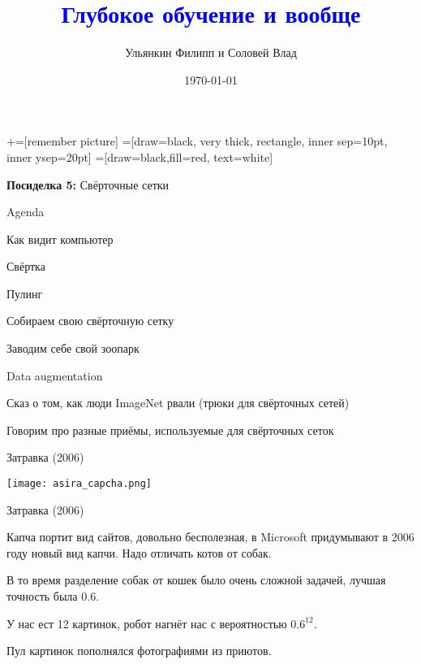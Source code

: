 \documentclass[notes,12pt, aspectratio=169]{beamer}
\title[]{\textcolor{blue}{Глубокое обучение и вообще}}
\author{Ульянкин Филипп и Соловей Влад}
\date{\today}
\newenvironment{wideitemize}{\itemize\addtolength{\itemsep}{10pt}}{\enditemize}
\begin{document}
\newcommand\marktopleft[1]{%
    \tikz[overlay,remember picture] 
        \node (marker-#1-a) at (-.3em,.3em) {};%
}
\newcommand\markbottomright[2]{%
    \tikz[overlay,remember picture] 
        \node (marker-#1-b) at (0em,0em) {};%
}
+=[remember picture] 
 =[draw=black, very thick, rectangle, inner sep=10pt, inner ysep=20pt]
 =[draw=black,fill=red, text=white]


\begin{frame}
\maketitle
\centering \textbf{\color{blue} Посиделка 5:} Свёрточные сетки
\end{frame}



\begin{frame}{Agenda}
\begin{wideitemize}
	\item Как видит компьютер
	\item Свёртка
	\item Пулинг
	\item Собираем свою свёрточную сетку 
	\item Заводим себе свой зоопарк 
	\item Data augmentation 
	\item Сказ о том, как люди ImageNet рвали  (трюки для свёрточных сетей)
	\item Говорим про разные приёмы, используемые для свёрточных сеток
\end{wideitemize} 
\end{frame}


\begin{frame}{Затравка (2006)}
\begin{center}
	\texttt{[image: asira\_capcha.png]}
\end{center}
\end{frame}


\begin{frame}{Затравка (2006)}
\begin{wideitemize}
	\item Капча портит вид сайтов, довольно бесполезная, в Microsoft придумывают в 2006 году новый вид капчи. Надо отличать котов от собак. 
	\item В то время разделение собак от кошек было очень сложной задачей, лучшая точность была $0.6$. 
	\item У нас ест 12 картинок, робот нагнёт нас с вероятностью $0.6^{12}$. 
	\item Пул картинок пополнялся фотографиями из приютов. 
\end{wideitemize} 
\end{frame}
\end{document}
